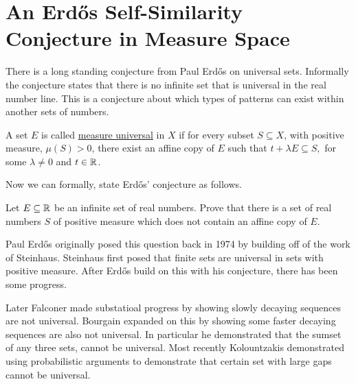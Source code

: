 \section{An Erd\H{o}s Self\hyphen{Similarity} Conjecture in Measure Space}
There is a long standing conjecture from Paul Erd\H{o}s on universal sets.  Informally the conjecture states that there is no infinite set that is universal in the real number line.  This is a conjecture about which types of  patterns can exist within another sets of numbers.  


\begin{definition}
    A set $E$ is called \underline{measure universal} in $X$ if for every subset $S \subseteq X$, with positive measure, $\mu (S) > 0$, there exist an affine copy of $E$ such that $t+\lambda E \subseteq S,$ for some $\lambda \neq 0$ and $t \in \mathbb{R}$.  
\end{definition}

Now we can formally, state Erd\H{o}s' conjecture as follows. 

\begin{conjecture}\label{ErdConj}
    Let $E\subseteq \mathbb{R}$ be an infinite set of real numbers.  Prove that there is a set of real numbers $S$ of positive measure which does not contain an affine copy of $E$.  
\end{conjecture}

Paul Erd\H{o}s originally posed this question back in 1974 by building off of the work of Steinhaus.  Steinhaus\cite{Steinhaus} first posed that finite sets are universal in sets with positive measure.  After Erd\H{o}s build on this with his conjecture, there has been some progress.

Later Falconer \cite{Falconer} made substatioal progress by showing slowly decaying sequences are not universal.  Bourgain \cite{Bourgain} expanded on this by showing some faster decaying sequences are also not universal.  In particular he demonstrated that the sumset of any three sets, cannot be universal.  Most recently Kolountzakis \cite{Kolo} demonstrated using probabilistic arguments to demonstrate that certain set with large gaps cannot be universal.  

